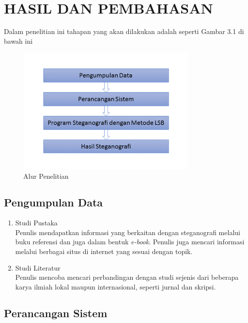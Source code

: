 
\chapter{HASIL DAN PEMBAHASAN}

Dalam penelitian ini tahapan yang akan dilakukan adalah seperti Gambar 3.1 di bawah ini

\begin{figure}[H]
	\centering
	\includegraphics[width=0.8\textwidth]{gambar/alur_penelitian}
	\caption{Alur Penelitian}
	\label{alur_penelitian}
\end{figure}

\section{Pengumpulan Data}
\begin{enumerate}
	\item Studi Pustaka\\
	Penulis mendapatkan informasi yang berkaitan dengan steganografi melalui buku referensi dan juga dalam bentuk \emph{e-book}. Penulis juga mencari informasi melalui berbagai situs di internet yang sesuai dengan topik.	
	\item Studi Literatur\\
	Penulis mencoba mencari perbandingan dengan studi sejenis dari beberapa karya ilmiah lokal maupun internasional, seperti jurnal dan skripsi.	 
\end{enumerate}

\section{Perancangan Sistem}

